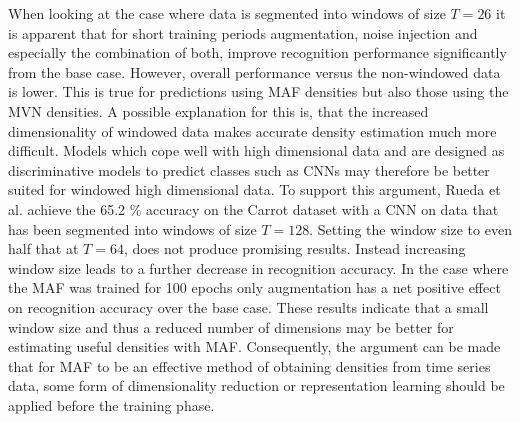 \documentclass[11pt,titlepage,oneside,openany]{book}
\begin{document}
When looking at the case where data is segmented into windows of size $T=26$ it is apparent that for short training periods augmentation, noise injection and especially the combination of both, improve recognition performance significantly from the base case. However, overall performance versus the non-windowed data is lower. This is true for predictions using MAF densities but also those using the MVN densities. A possible explanation for this is, that the increased dimensionality of windowed data makes accurate density estimation much more difficult. Models which cope well with high dimensional data and are designed as discriminative models to predict classes such as CNNs may therefore be better suited for windowed high dimensional data. To support this argument, Rueda et al. \cite{rueda_combining_2019} achieve the 65.2 \% accuracy on the Carrot dataset with a CNN on data that has been segmented into windows of size $T=128$. Setting the window size to even half that at $T=64$, does not produce promising results. Instead increasing window size leads to a further decrease in recognition accuracy. In the case where the MAF was trained for 100 epochs only augmentation has a net positive effect on recognition accuracy over the base case. These results indicate that a small window size and thus a reduced number of dimensions may be better for estimating useful densities with MAF. Consequently, the argument can be made that for MAF to be an effective method of obtaining densities from time series data, some form of dimensionality reduction or representation learning should be applied before the training phase.
\end{document}
